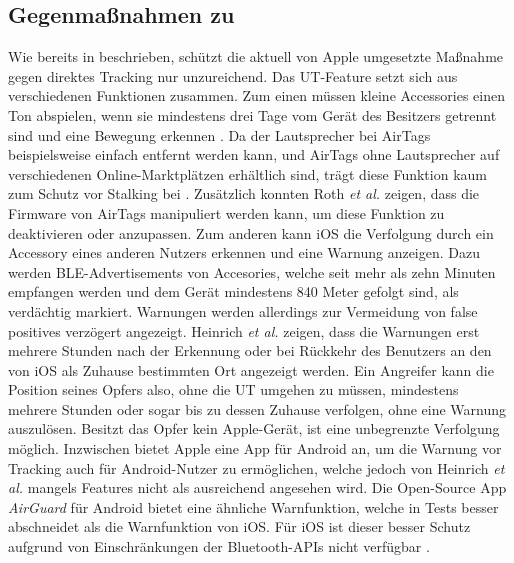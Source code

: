 \subsection{Gegenmaßnahmen zu }

Wie bereits in  beschrieben, schützt die aktuell von Apple umgesetzte Maßnahme gegen direktes Tracking nur unzureichend.
Das \ac{UT}-Feature setzt sich aus verschiedenen Funktionen zusammen.
Zum einen müssen kleine Accessories einen Ton abspielen, wenn sie mindestens drei Tage vom Gerät des Besitzers getrennt sind und eine Bewegung erkennen \cite{Apple_FindMySpec}.
Da der Lautsprecher bei AirTags beispielsweise einfach entfernt werden kann, und AirTags ohne Lautsprecher auf verschiedenen Online-Marktplätzen erhältlich sind, trägt diese Funktion kaum zum Schutz vor Stalking bei \cite{Heinrich_AirGuard}.
Zusätzlich konnten Roth \textit{et al.} \cite{Roth_airtags} zeigen, dass die Firmware von AirTags manipuliert werden kann, um diese Funktion zu deaktivieren oder anzupassen.
Zum anderen kann iOS die Verfolgung durch ein Accessory eines anderen Nutzers erkennen und eine Warnung anzeigen.
Dazu werden \ac{BLE}-Advertisements von Accesories, welche seit mehr als zehn Minuten empfangen werden und dem Gerät mindestens 840 Meter gefolgt sind, als verdächtig markiert.
Warnungen werden allerdings zur Vermeidung von false positives verzögert angezeigt.
Heinrich \textit{et al.} \cite{Heinrich_AirGuard} zeigen, dass die Warnungen erst mehrere Stunden nach der Erkennung oder bei Rückkehr des Benutzers an den von iOS als Zuhause bestimmten Ort angezeigt werden.
Ein Angreifer kann die Position seines Opfers also, ohne die \ac{UT} umgehen zu müssen, mindestens mehrere Stunden oder sogar bis zu dessen Zuhause verfolgen, ohne eine Warnung auszulösen.
Besitzt das Opfer kein Apple-Gerät, ist eine unbegrenzte Verfolgung möglich.
Inzwischen bietet Apple eine App für Android an, um die Warnung vor Tracking auch für Android-Nutzer zu ermöglichen, welche jedoch von Heinrich \textit{et al.} \cite{Heinrich_AirGuard} mangels Features nicht als ausreichend angesehen wird.
Die Open-Source App \textit{AirGuard} für Android bietet eine ähnliche Warnfunktion, welche in Tests besser abschneidet als die Warnfunktion von iOS.
Für iOS ist dieser besser Schutz aufgrund von Einschränkungen der Bluetooth-\acp{API} nicht verfügbar \cite{Heinrich_AirGuard}.

